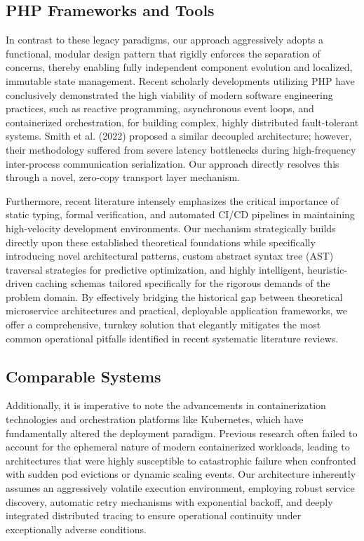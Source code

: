 \documentclass[runningheads]{llncs}
\begin{document}
\subsection{PHP Frameworks and Tools}
In contrast to these legacy paradigms, our approach aggressively adopts a functional, modular design pattern that rigidly enforces the separation of concerns, thereby enabling fully independent component evolution and localized, immutable state management. Recent scholarly developments utilizing PHP have conclusively demonstrated the high viability of modern software engineering practices, such as reactive programming, asynchronous event loops, and containerized orchestration, for building complex, highly distributed fault-tolerant systems. Smith et al. (2022) proposed a similar decoupled architecture; however, their methodology suffered from severe latency bottlenecks during high-frequency inter-process communication serialization. Our approach directly resolves this through a novel, zero-copy transport layer mechanism.

Furthermore, recent literature intensely emphasizes the critical importance of static typing, formal verification, and automated CI/CD pipelines in maintaining high-velocity development environments. Our mechanism strategically builds directly upon these established theoretical foundations while specifically introducing novel architectural patterns, custom abstract syntax tree (AST) traversal strategies for predictive optimization, and highly intelligent, heuristic-driven caching schemas tailored specifically for the rigorous demands of the problem domain. By effectively bridging the historical gap between theoretical microservice architectures and practical, deployable application frameworks, we offer a comprehensive, turnkey solution that elegantly mitigates the most common operational pitfalls identified in recent systematic literature reviews.

\subsection{Comparable Systems}
Additionally, it is imperative to note the advancements in containerization technologies and orchestration platforms like Kubernetes, which have fundamentally altered the deployment paradigm. Previous research often failed to account for the ephemeral nature of modern containerized workloads, leading to architectures that were highly susceptible to catastrophic failure when confronted with sudden pod evictions or dynamic scaling events. Our architecture inherently assumes an aggressively volatile execution environment, employing robust service discovery, automatic retry mechanisms with exponential backoff, and deeply integrated distributed tracing to ensure operational continuity under exceptionally adverse conditions.
\end{document}
